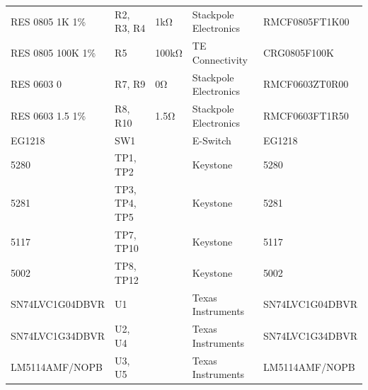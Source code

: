 \documentclass{standalone}
\begin{document}
\begin{tabular}{lllll}
	RES 0805 1K 1\%                       & R2, R3, R4          & 1kΩ                & Stackpole Electronics        & RMCF0805FT1K00       \\
	RES 0805 100K 1\%                     & R5                  & 100kΩ              & TE Connectivity              & CRG0805F100K         \\
	RES 0603 0                            & R7, R9              & 0Ω                 & Stackpole Electronics        & RMCF0603ZT0R00       \\
	RES 0603 1.5 1\%                      & R8, R10             & 1.5Ω               & Stackpole Electronics        & RMCF0603FT1R50       \\
	EG1218                                & SW1                 &                    & E-Switch                     & EG1218               \\
	5280                                  & TP1, TP2            &                    & Keystone                     & 5280                 \\
	5281                                  & TP3, TP4, TP5       &                    & Keystone                     & 5281                 \\
	5117                                  & TP7, TP10           &                    & Keystone                     & 5117                 \\
	5002                                  & TP8, TP12           &                    & Keystone                     & 5002                 \\
	SN74LVC1G04DBVR                       & U1                  &                    & Texas Instruments            & SN74LVC1G04DBVR      \\
	SN74LVC1G34DBVR                       & U2, U4              &                    & Texas Instruments            & SN74LVC1G34DBVR      \\
	LM5114AMF/NOPB                        & U3, U5              &                    & Texas Instruments            & LM5114AMF/NOPB       \\
	\bottomrule
\end{tabular}
\end{document}
